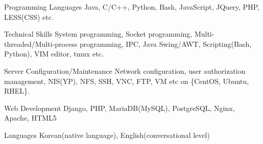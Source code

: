 


\begin{cvskills}


\cvskill
{Programming Languages} %
{Java, C/C++, Python, Bash, JavaScript, JQuery, PHP, LESS(CSS) etc.} %


\cvskill
{Technical Skills} %
{System programming, Socket programming, Multi-threaded/Multi-process programming,\newline
IPC, Java Swing/AWT, Scripting(Bash, Python), VIM editor, tmux etc.} %


\cvskill
{Server Configuration/Maintenance} %
{Network configuration, user authorization management, NIS(YP), NFS, SSH,\newline
VNC, FTP, VM etc on \{CentOS, Ubuntu, RHEL\}.} %


\cvskill
{Web Development} %
{Django, PHP, MariaDB(MySQL), PostgreSQL, Nginx, Apache, HTML5} %


\cvskill
{Languages} %
{Korean(native language), English(conversational level)} %


\end{cvskills}
